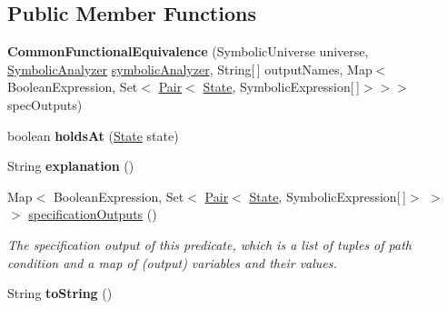 \subsection*{Public Member Functions}
\begin{DoxyCompactItemize}
\item 
\hypertarget{classedu_1_1udel_1_1cis_1_1vsl_1_1civl_1_1predicate_1_1common_1_1CommonFunctionalEquivalence_a99fc80fa652ee00c0e545d20b304559a}{}{\bfseries Common\+Functional\+Equivalence} (Symbolic\+Universe universe, \hyperlink{interfaceedu_1_1udel_1_1cis_1_1vsl_1_1civl_1_1semantics_1_1IF_1_1SymbolicAnalyzer}{Symbolic\+Analyzer} \hyperlink{classedu_1_1udel_1_1cis_1_1vsl_1_1civl_1_1predicate_1_1common_1_1CommonCIVLStatePredicate_aae6b467bb269d59726bab69c91b5ccef}{symbolic\+Analyzer}, String\mbox{[}$\,$\mbox{]} output\+Names, Map$<$ Boolean\+Expression, Set$<$ \hyperlink{classedu_1_1udel_1_1cis_1_1vsl_1_1civl_1_1util_1_1IF_1_1Pair}{Pair}$<$ \hyperlink{interfaceedu_1_1udel_1_1cis_1_1vsl_1_1civl_1_1state_1_1IF_1_1State}{State}, Symbolic\+Expression\mbox{[}$\,$\mbox{]}$>$$>$$>$ spec\+Outputs)\label{classedu_1_1udel_1_1cis_1_1vsl_1_1civl_1_1predicate_1_1common_1_1CommonFunctionalEquivalence_a99fc80fa652ee00c0e545d20b304559a}

\item 
\hypertarget{classedu_1_1udel_1_1cis_1_1vsl_1_1civl_1_1predicate_1_1common_1_1CommonFunctionalEquivalence_ab8c7304386724394ebfcd391071a671d}{}boolean {\bfseries holds\+At} (\hyperlink{interfaceedu_1_1udel_1_1cis_1_1vsl_1_1civl_1_1state_1_1IF_1_1State}{State} state)\label{classedu_1_1udel_1_1cis_1_1vsl_1_1civl_1_1predicate_1_1common_1_1CommonFunctionalEquivalence_ab8c7304386724394ebfcd391071a671d}

\item 
\hypertarget{classedu_1_1udel_1_1cis_1_1vsl_1_1civl_1_1predicate_1_1common_1_1CommonFunctionalEquivalence_affcc334ab77b5d53ab3d23599eaa0b26}{}String {\bfseries explanation} ()\label{classedu_1_1udel_1_1cis_1_1vsl_1_1civl_1_1predicate_1_1common_1_1CommonFunctionalEquivalence_affcc334ab77b5d53ab3d23599eaa0b26}

\item 
Map$<$ Boolean\+Expression, Set$<$ \hyperlink{classedu_1_1udel_1_1cis_1_1vsl_1_1civl_1_1util_1_1IF_1_1Pair}{Pair}$<$ \hyperlink{interfaceedu_1_1udel_1_1cis_1_1vsl_1_1civl_1_1state_1_1IF_1_1State}{State}, Symbolic\+Expression\mbox{[}$\,$\mbox{]}$>$ $>$ $>$ \hyperlink{classedu_1_1udel_1_1cis_1_1vsl_1_1civl_1_1predicate_1_1common_1_1CommonFunctionalEquivalence_ab1e372ede439564a292e73454c05ca8c}{specification\+Outputs} ()
\begin{DoxyCompactList}\small\item\em The specification output of this predicate, which is a list of tuples of path condition and a map of (output) variables and their values. \end{DoxyCompactList}\item 
\hypertarget{classedu_1_1udel_1_1cis_1_1vsl_1_1civl_1_1predicate_1_1common_1_1CommonFunctionalEquivalence_adc3829fba97a86402ff084b759ffc319}{}String {\bfseries to\+String} ()\label{classedu_1_1udel_1_1cis_1_1vsl_1_1civl_1_1predicate_1_1common_1_1CommonFunctionalEquivalence_adc3829fba97a86402ff084b759ffc319}


\end{DoxyCompactItemize}

